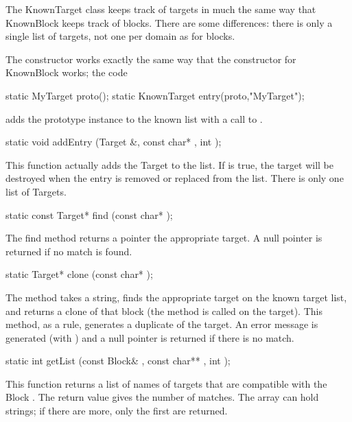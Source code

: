 The KnownTarget class keeps track of targets in much the same way
that KnownBlock keeps track of blocks.  There are some differences:
there is only a single list of targets, not one per domain as for
blocks.

The constructor works exactly the same way that the constructor for
KnownBlock works; the code

\begin{example}
static MyTarget proto();
static KnownTarget entry(proto,"MyTarget");
\end{example}

adds the prototype instance to the known list with a call to
.

\begin{example}
static void addEntry (Target &, const char* , int );
\end{example}

This function actually adds the Target to the list.  If  is true,
the target will be destroyed when the entry is removed or replaced from
the list.  There is only one list of Targets.

\begin{example}
static const Target* find (const char* );
\end{example}

The find method returns a pointer the appropriate target.
A null pointer is returned if no match
is found.

\begin{example}
static Target* clone (const char* );
\end{example}

The  method takes a string, finds the appropriate target on
the known target list, and returns a clone of that block (the
 method is called on the target).  This method, as
a rule, generates a duplicate of the target.
An error message is generated (with ) and
a null pointer is returned if there is no match.

\begin{example}
static int getList (const Block& , const char** , int );
\end{example}

This function returns a list of names of targets that are compatible
with the Block .  The return value gives the number of matches.
The  array can hold  strings; if there are more,
only the first  are returned.

